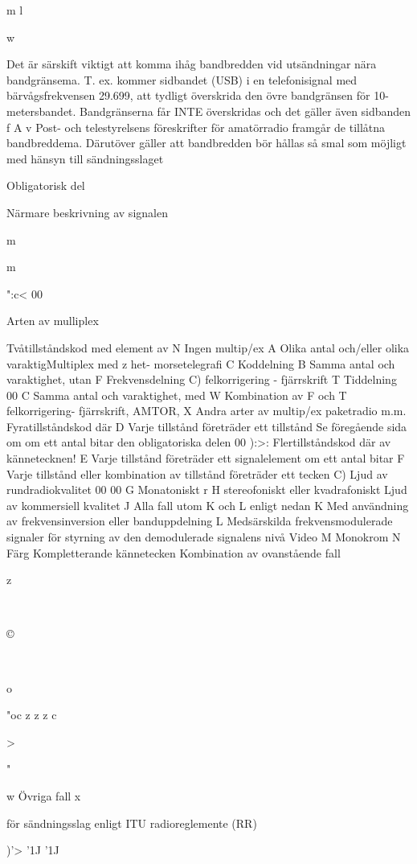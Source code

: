 \documentclass[a4paper,twoside,twocolumn,openright]{book}
\begin{document}
{{{{{{{{{{{m
l

w

Det är särskift viktigt att komma ihåg bandbredden vid utsändningar nära bandgränsema. T. ex.
kommer sidbandet (USB) i en telefonisignal med
bärvågsfrekvensen 29.699, att tydligt överskrida
den övre bandgränsen för 10-metersbandet. Bandgränserna får INTE överskridas och det gäller även
sidbanden f
A v Post- och telestyrelsens föreskrifter för amatörradio framgår de tillåtna bandbreddema. Därutöver gäller att bandbredden bör hållas så smal som
möjligt med hänsyn till sändningsslaget

Obligatorisk del

Närmare beskrivning av signalen

m

m

":c<
00

Arten av mulliplex

Tvåtillståndskod med element av
N Ingen multip/ex
A Olika antal och/eller olika varaktigMultiplex med
z
het- morsetelegrafi
C Koddelning
B Samma antal och varaktighet, utan
F Frekvensdelning
C)
felkorrigering - fjärrskrift
T Tiddelning
00
C Samma antal och varaktighet, med
W Kombination av F och T
felkorrigering- fjärrskrift, AMTOR,
X Andra arter av multip/ex
paketradio m.m.
Fyratillståndskod där
D Varje tillstånd företräder ett tillstånd
Se föregående sida om
om ett antal bitar
den obligatoriska delen
00
):>:
Flertillståndskod där
av kännetecknen!
E Varje tillstånd företräder ett signalelement om ett antal bitar
F Varje tillstånd eller kombination av
tillstånd företräder ett tecken
C)
Ljud av rundradiokvalitet
00
00
G Monatoniskt
r
H stereofoniskt eller kvadrafoniskt
Ljud av kommersiell kvalitet
J Alla fall utom K och L enligt nedan
K Med användning av frekvensinversion eller banduppdelning
L Medsärskilda frekvensmodulerade signaler för styrning av den demodulerade signalens nivå
Video
M Monokrom
N Färg
Kompletterande kännetecken
Kombination av ovanstående fall

z

~

©

~

o

"oc
z
z
z
c

>

"

w
Övriga fall
x

för sändningsslag enligt
ITU radioreglemente (RR)

)'>
'1J
'1J

}}}}}}}}}}}
\end{document}
